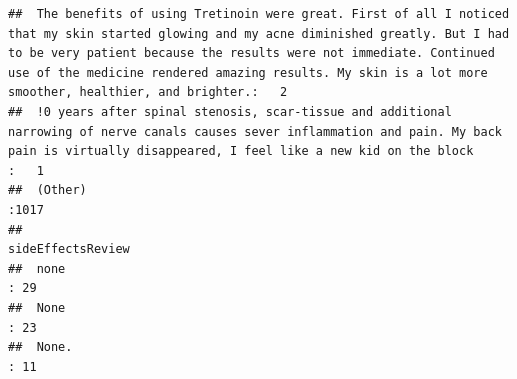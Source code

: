 \documentclass[spanish,]{article}
\begin{document}
\begin{verbatim}
##  The benefits of using Tretinoin were great. First of all I noticed that my skin started glowing and my acne diminished greatly. But I had to be very patient because the results were not immediate. Continued use of the medicine rendered amazing results. My skin is a lot more smoother, healthier, and brighter.:   2  
##  !0 years after spinal stenosis, scar-tissue and additional narrowing of nerve canals causes sever inflammation and pain. My back pain is virtually disappeared, I feel like a new kid on the block                                                                                                                   :   1  
##  (Other)                                                                                                                                                                                                                                                                                                              :1017  
##                                                                                                                                                                                                                                                                                                                                                                                                             sideEffectsReview
##  none                                                                                                                                                                                                                                                                                                                                                                                                                : 29    
##  None                                                                                                                                                                                                                                                                                                                                                                                                                : 23    
##  None.                                                                                                                                                                                                                                                                                                                                                                                                               : 11    

\end{verbatim}
\end{document}
